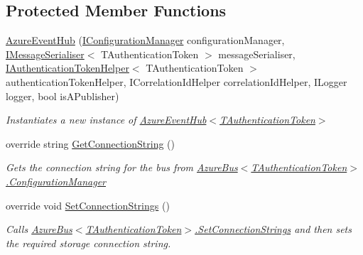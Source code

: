 \subsection*{Protected Member Functions}
\begin{DoxyCompactItemize}
\item 
\hyperlink{classCqrs_1_1Azure_1_1ServiceBus_1_1AzureEventHub_adef2c26639ae4a7725c397da7fd90000_adef2c26639ae4a7725c397da7fd90000}{Azure\+Event\+Hub} (\hyperlink{interfaceCqrs_1_1Configuration_1_1IConfigurationManager}{I\+Configuration\+Manager} configuration\+Manager, \hyperlink{interfaceCqrs_1_1Azure_1_1ServiceBus_1_1IMessageSerialiser}{I\+Message\+Serialiser}$<$ T\+Authentication\+Token $>$ message\+Serialiser, \hyperlink{interfaceCqrs_1_1Authentication_1_1IAuthenticationTokenHelper}{I\+Authentication\+Token\+Helper}$<$ T\+Authentication\+Token $>$ authentication\+Token\+Helper, I\+Correlation\+Id\+Helper correlation\+Id\+Helper, I\+Logger logger, bool is\+A\+Publisher)
\begin{DoxyCompactList}\small\item\em Instantiates a new instance of \hyperlink{classCqrs_1_1Azure_1_1ServiceBus_1_1AzureEventHub_adef2c26639ae4a7725c397da7fd90000_adef2c26639ae4a7725c397da7fd90000}{Azure\+Event\+Hub$<$\+T\+Authentication\+Token$>$} \end{DoxyCompactList}\item 
override string \hyperlink{classCqrs_1_1Azure_1_1ServiceBus_1_1AzureEventHub_a9855633b53ed1f67863ef9dffad0812c_a9855633b53ed1f67863ef9dffad0812c}{Get\+Connection\+String} ()
\begin{DoxyCompactList}\small\item\em Gets the connection string for the bus from \hyperlink{classCqrs_1_1Azure_1_1ServiceBus_1_1AzureBus_aaf9469d220fb23cb0521fa76b25ab228_aaf9469d220fb23cb0521fa76b25ab228}{Azure\+Bus$<$\+T\+Authentication\+Token$>$.\+Configuration\+Manager} \end{DoxyCompactList}\item 
override void \hyperlink{classCqrs_1_1Azure_1_1ServiceBus_1_1AzureEventHub_af823e573f3acc3fa9949969499309db1_af823e573f3acc3fa9949969499309db1}{Set\+Connection\+Strings} ()
\begin{DoxyCompactList}\small\item\em Calls \hyperlink{classCqrs_1_1Azure_1_1ServiceBus_1_1AzureBus_a8a1be9145b0a92c0037ef1b8b4cc79d9_a8a1be9145b0a92c0037ef1b8b4cc79d9}{Azure\+Bus$<$\+T\+Authentication\+Token$>$.\+Set\+Connection\+Strings} and then sets the required storage connection string. \end{DoxyCompactList}\item 

\end{DoxyCompactItemize}
